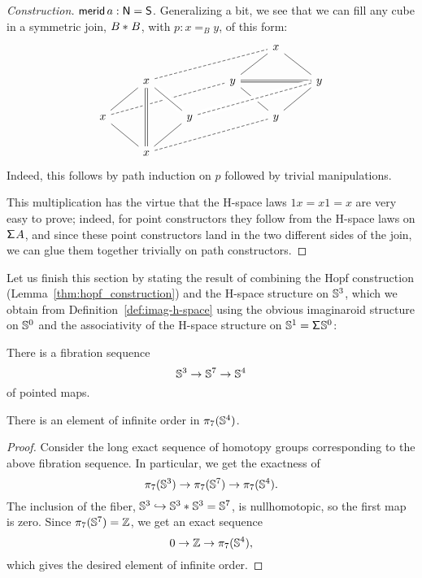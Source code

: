 \begin{proof}[Construction]
$\mathsf{merid}\,a:\mathsf{N}=\mathsf{S}$. Generalizing a bit, we see that we can fill
any cube in a symmetric join, ${B}\ast_{}{B}$, with $p:x=_By$, of this form:
\begin{equation*}
  \begin{tikzcd}[every arrow/.append style={-}]
    &   &   &   & x\arrow{dl}\arrow{dr} & \\
    & x\arrow{dl}\arrow{dr}\arrow[dashed]{urrr} &
    & y\arrow{dr}\arrow[-, double equal sign distance]{rr} & & y\arrow{dl} \\
    x\arrow{dr}\arrow[dashed]{urrr} & &
    y\arrow[crossing over]{ul}\arrow{dl}\arrow[dashed,crossing over]{urrr} &
    & y & \\
    & x\arrow[-, double equal sign distance,crossing over]{uu}\arrow[dashed]{urrr} & & & &
  \end{tikzcd}
\end{equation*}
Indeed, this follows by path induction on $p$ followed by trivial
manipulations.

This multiplication has the virtue that the H-space laws $1x=x1=x$ are
very easy to prove; indeed, for point constructors they follow from
the H-space laws on $\mathsf{\Sigma}^{} A$, and since these point constructors land
in the two different sides of the join, we can glue them together
trivially on path constructors.
\end{proof}

Let us finish this section by stating the result of combining
the Hopf construction (Lemma~\ref{thm:hopf_construction}) and the
H-space structure on $\mathbb{S}^3$, which we obtain from
Definition~\ref{def:imag-h-space} using the obvious imaginaroid
structure on $\mathbb{S}^0$ and the associativity of the H-space structure on
$\mathbb{S}^1=\mathsf{\Sigma}^{}\mathbb{S}^0$:
\begin{thm}
  There is a fibration sequence
  \[
    \mathbb{S}^3 \to \mathbb{S}^7 \to \mathbb{S}^4
  \]
  of pointed maps.
\end{thm}
\begin{cor}
  There is an element of infinite order in $\pi_7(\mathbb{S}^4)$.
\end{cor}
\begin{proof}
  Consider the long exact sequence of homotopy groups
  \cite[Theorem~8.4.6]{TheBook} corresponding to the above fibration
  sequence. In particular, we get the exactness of
  \[
    \pi_7(\mathbb{S}^3) \to \pi_7(\mathbb{S}^7) \to \pi_7(\mathbb{S}^4).
  \]
  The inclusion of the fiber, $\mathbb{S}^3 \hookrightarrow
  {\mathbb{S}^3}\ast_{}{\mathbb{S}^3} = \mathbb{S}^7$, is nullhomotopic, so the first map is
  zero. Since $\pi_7(\mathbb{S}^7) = \mathbb{Z}$, we get an exact sequence
  \[
    0 \to \mathbb{Z} \to \pi_7(\mathbb{S}^4),
  \]
  which gives the desired element of infinite order.
\end{proof}
